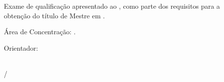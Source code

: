 \begingroup

\centering

\large
\authorname

\vspace{1.5 cm}

\doctitlebrazilian

\normalsize

\vspace{1.5 cm}

\begin{flushright}
\begin{adjustwidth}{.5\textwidth}{}
Exame de qualificação apresentado ao \universityfull, como parte dos requisitos para a obtenção do título de Mestre em \knowledgearea.

Área de Concentração: \knowledgearea.

\hfill \newline
Orientador: \supervisor
\end{adjustwidth}
\end{flushright}

\vfill

\begin{center}
\large
\state\\
\thesismonth\slash\thesisyear
\end{center}

\endgroup